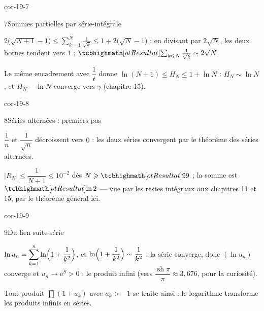 \begin{blocLivre}{cor-19-7}
\begin{corrige}{7}{Sommes partielles par série-intégrale}
\begin{questions}
  \item $2\bigl(\sqrt{N+1}-1\bigr)\leqslant
    \displaystyle\sum_{k=1}^{N}\frac{1}{\sqrt k}\leqslant1+2\bigl(\sqrt
    N-1\bigr)$ : en divisant par $2\sqrt N$, les deux bornes tendent vers
    $1$ : $\res{\sum_{k\leqslant N}\tfrac{1}{\sqrt k}\sim2\sqrt N}$.
  \item Le même encadrement avec $\dfrac1t$ donne
    $\ln(N+1)\leqslant H_N\leqslant1+\ln N$ : $H_N\sim\ln N$, et
    $H_N-\ln N$ converge vers $\gamma$ (chapitre 15).
\end{questions}
\end{corrige}
\end{blocLivre}

\begin{blocLivre}{cor-19-8}
\begin{corrige}{8}{Séries alternées : premiers pas}
\begin{questions}
  \item $\dfrac1n$ et $\dfrac{1}{\sqrt n}$ décroissent vers $0$ : les
    deux séries convergent par le théorème des séries alternées.
  \item $|R_N|\leqslant\dfrac{1}{N+1}\leqslant10^{-2}$ dès
    $N\geqslant\res{99}$ ; la somme est $\res{\ln2}$ — vue par les restes
    intégraux aux chapitres 11 et 15, par le théorème général ici.
\end{questions}
\end{corrige}
\end{blocLivre}

\begin{blocLivre}{cor-19-9}
\begin{corrige}{9}{Du lien suite-série}
\begin{questions}
  \item $\ln u_n=\displaystyle\sum_{k=1}^{n}\ln\Bigl(1+\frac{1}{k^{2}}\Bigr)$,
    et $\ln\Bigl(1+\dfrac{1}{k^{2}}\Bigr)\sim\dfrac{1}{k^{2}}$ : la série
    converge, donc $(\ln u_n)$ converge et
    $u_n\to\mathrm{e}^{S}>0$ : le produit infini 
    (vers $\dfrac{\operatorname{sh}\pi}{\pi}\approx3{,}676$, pour la
    curiosité).
  \item Tout produit $\prod(1+a_k)$ avec $a_k>-1$ se traite ainsi : le
    logarithme transforme les produits infinis en séries.
\end{questions}
\end{corrige}
\end{blocLivre}

